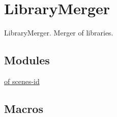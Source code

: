 \hypertarget{group___library_merger}{}\section{Library\+Merger}
\label{group___library_merger}


Library\+Merger. Merger of libraries.  


\subsection*{Modules}
\begin{DoxyCompactItemize}
\item 
\hyperlink{group___constants}{of scenes-\/id}
\end{DoxyCompactItemize}
\subsection*{Macros}
